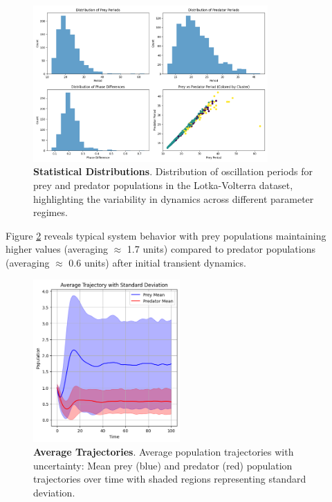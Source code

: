 \documentclass{article}
\begin{document}
\begin{figure} [H]
    \centering
    \includegraphics[width=0.8\textwidth]{period_distributions}
    \caption{\textbf{Statistical Distributions}. Distribution of oscillation periods for prey and predator populations in the Lotka-Volterra dataset, highlighting the variability in dynamics across different parameter regimes. }
    \label{fig:periods}
\end{figure}

Figure \ref{fig:average_trajectories} reveals typical system behavior with prey populations maintaining higher values (averaging $\approx$ 1.7 units) compared to predator populations (averaging $\approx$ 0.6 units) after initial transient dynamics.

\begin{figure} [H]
    \centering
    \includegraphics[width=0.5\textwidth]{overview_distribution}
    \caption{\textbf{Average Trajectories}. Average population trajectories with uncertainty: Mean prey (blue) and predator (red) population trajectories over time with shaded regions representing standard deviation.}
    \label{fig:average_trajectories}
\end{figure}
\end{document}
